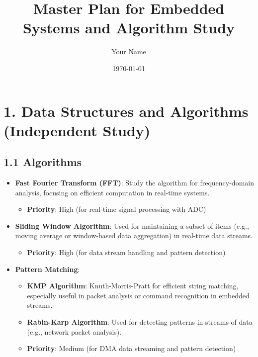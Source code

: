 \documentclass{article}
\title{Master Plan for Embedded Systems and Algorithm Study}
\author{Your Name}
\date{\today}
\begin{document}
\maketitle

\section*{1. Data Structures and Algorithms (Independent Study)}

\subsection*{1.1 Algorithms}
\begin{itemize}
    \item \textbf{Fast Fourier Transform (FFT)}: Study the algorithm for frequency-domain analysis, focusing on efficient computation in real-time systems.
    \begin{itemize}
        \item \textbf{Priority}: High (for real-time signal processing with ADC)
    \end{itemize}
    
    \item \textbf{Sliding Window Algorithm}: Used for maintaining a subset of items (e.g., moving average or window-based data aggregation) in real-time data streams.
    \begin{itemize}
        \item \textbf{Priority}: High (for data stream handling and pattern detection)
    \end{itemize}
    
    \item \textbf{Pattern Matching}:
    \begin{itemize}
        \item \textbf{KMP Algorithm}: Knuth-Morris-Pratt for efficient string matching, especially useful in packet analysis or command recognition in embedded streams.
        \item \textbf{Rabin-Karp Algorithm}: Used for detecting patterns in streams of data (e.g., network packet analysis).
        \item \textbf{Priority}: Medium (for DMA data streaming and pattern detection)
    \end{itemize}
\end{itemize}
\end{document}

